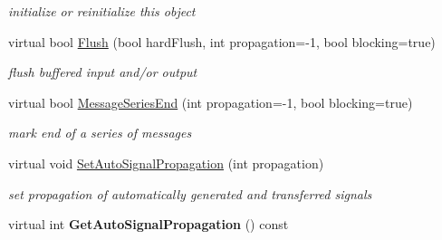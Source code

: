 \begin{DoxyCompactItemize}
\begin{DoxyCompactList}\small\item\em initialize or reinitialize this object \item\end{DoxyCompactList}\item 
virtual bool \hyperlink{class_buffered_transformation_ac6c7f9508d50155d9e75c295b8bc5743}{Flush} (bool hardFlush, int propagation=-\/1, bool blocking=true)
\begin{DoxyCompactList}\small\item\em flush buffered input and/or output \item\end{DoxyCompactList}\item 
virtual bool \hyperlink{class_buffered_transformation_a9c9abc61e1cc6c8541a5657e68df1f36}{MessageSeriesEnd} (int propagation=-\/1, bool blocking=true)
\begin{DoxyCompactList}\small\item\em mark end of a series of messages \item\end{DoxyCompactList}\item 
virtual void \hyperlink{class_buffered_transformation_ae77dc2fddb3ff142effb00eff3217581}{SetAutoSignalPropagation} (int propagation)
\begin{DoxyCompactList}\small\item\em set propagation of automatically generated and transferred signals \item\end{DoxyCompactList}\item 
\hypertarget{class_buffered_transformation_a7367757722f390fae20607afe0f916c5}{
virtual int {\bfseries GetAutoSignalPropagation} () const }
\label{class_buffered_transformation_a7367757722f390fae20607afe0f916c5}

\end{DoxyCompactItemize}
